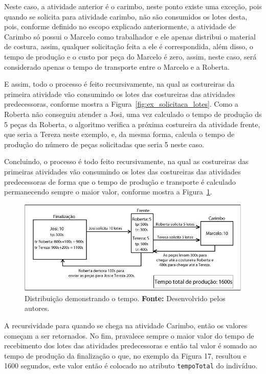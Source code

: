 \par Neste caso, a atividade anterior é o carimbo, neste ponto existe uma exceção, pois quando 
se solicita para atividade carimbo, não são consumidos os lotes desta, pois, conforme definido 
no escopo explicado anteriormente, a atividade de Carimbo só possui o Marcelo como trabalhador e ele
apenas distribui o material de costura, assim, qualquer solicitação feita a ele é correspondida, além disso, o 
tempo de produção e o custo por peça do Marcelo é zero, assim, neste caso, será
considerado apenas o tempo de transporte entre o Marcelo e a Roberta.

\par E assim, todo  o processo é feito recursivamente, na qual as costureiras
da primeira atividade vão consumindo os lotes das costureiras das atividades
predecessoras, conforme mostra a Figura~\ref{fig:ex_solicitaca_lotes}.
Como a Roberta não conseguiu atender a Josi, uma vez calculado o tempo de produção ds 5 peças da Roberta, 
o algoritmo verifica a próxima costureira da atividade frente, que seria a Tereza neste exemplo, e, da mesma forma, calcula
o tempo de produção do número de peças solicitadas que seria 5 neste caso.

\par Concluindo, o processo é todo feito recursivamente, na qual as costureiras das primeiras atividades vão consumindo
os lotes das costureiras das atividades predecessoras de forma que o tempo de produção e transporte é calculado permanecendo 
sempre o maior valor, conforme mostra a Figura~\ref{fig:ex_tempo_producao}. 

\begin{figure}[h!]
	\centerline{\includegraphics[scale=1.2]{./imagens/distribuicao_tempo.png}}
	\caption[Distribuição demonstrando o tempo.]
	{Distribuição demonstrando o tempo.
		\textbf{Fonte:} Desenvolvido pelos autores.}
	\label{fig:ex_tempo_producao}
\end{figure}

\par A recursividade para quando se chega na atividade Carimbo, então os valores começam a ser retornados.  
No fim, pravalece sempre o maior valor do tempo de recebimento dos lotes das atividades predecessoras e 
então tal valor é somado ao tempo de produção da finalização o que, no exemplo da Figura 17, resultou e 1600 segundos,
este valor então é colocado no atributo \texttt{tempoTotal} do indivíduo.

